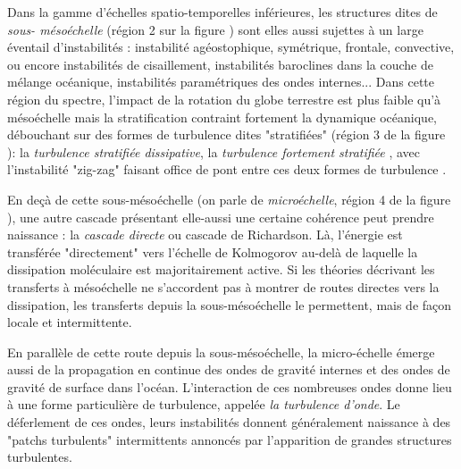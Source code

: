 Dans la gamme d'échelles spatio-temporelles inférieures, les structures dites de \textit{sous- mésoéchelle} (région 2 sur la figure ) sont elles aussi sujettes à un large éventail d'instabilités \citep{mcwilliams_submesoscale_2016}: instabilité agéostophique, symétrique, frontale, convective, ou encore instabilités de cisaillement, instabilités baroclines dans la couche de mélange océanique, instabilités paramétriques des ondes internes... Dans cette région du spectre, l'impact de la rotation du globe terrestre est plus faible qu'à mésoéchelle mais la stratification contraint fortement la dynamique océanique, débouchant sur des formes de turbulence dites "stratifiées" (région 3 de la figure ): la \textit{turbulence stratifiée dissipative}, la \textit{turbulence fortement stratifiée} \citep{augier_turbulence_2012}, avec l'instabilité "zig-zag" faisant office de pont entre ces deux formes de turbulence \citep{billant_zigzag_2010}.

En deçà de cette sous-mésoéchelle (on parle de \textit{microéchelle}, région 4 de la figure ), une autre cascade présentant elle-aussi une certaine cohérence peut prendre naissance : la \textit{cascade directe} ou cascade de Richardson. Là, l'énergie est transférée "directement" vers l'échelle de Kolmogorov au-delà de laquelle la dissipation moléculaire est majoritairement active. Si les théories décrivant les transferts à mésoéchelle ne s'accordent pas à montrer de routes directes vers la dissipation, les transferts depuis la sous-mésoéchelle le permettent, mais de façon locale et intermittente.

En parallèle de cette route depuis la sous-mésoéchelle, la micro-échelle émerge aussi de la propagation en continue des ondes de gravité internes et des ondes de gravité de surface dans l'océan. L'interaction de ces nombreuses ondes donne lieu à une forme particulière de turbulence, appelée \textit{la turbulence d'onde}. Le déferlement de ces ondes, leurs instabilités donnent généralement naissance à des "patchs turbulents" intermittents annoncés par l'apparition de grandes structures turbulentes.


